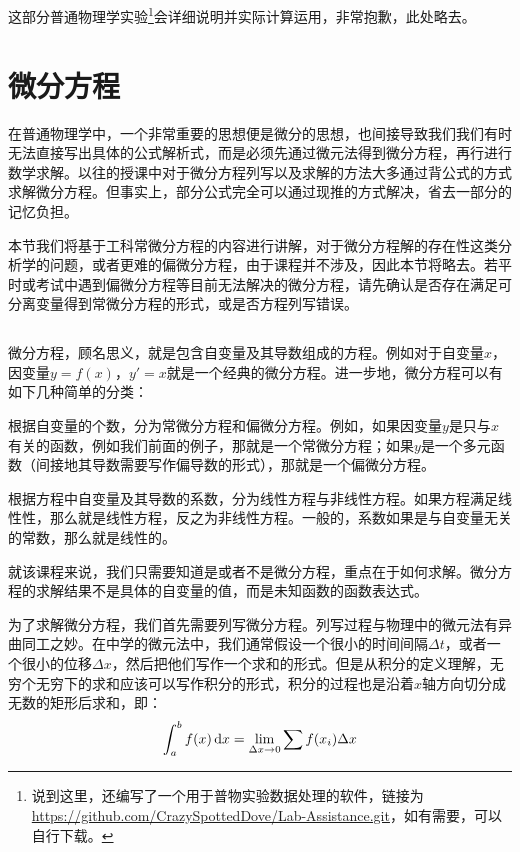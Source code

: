 \section[数据处理]{}
这部分普通物理学实验\footnote{说到这里，\dove 还编写了一个用于普物实验数据处理的软件，链接为 \url{https://github.com/CrazySpottedDove/Lab-Assistance.git}，如有需要，可以自行下载。}会详细说明并实际计算运用，非常抱歉，此处略去。

\section[微分方程]{微分方程}
在普通物理学中，一个非常重要的思想便是微分的思想，也间接导致我们我们有时无法直接写出具体的公式解析式，而是必须先通过微元法得到微分方程，再行进行数学求解。以往的授课中对于微分方程列写以及求解的方法大多通过背公式的方式求解微分方程。但事实上，部分公式完全可以通过现推的方式解决，省去一部分的记忆负担。

本节我们将基于工科常微分方程的内容进行讲解，对于微分方程解的存在性这类分析学的问题，或者更难的偏微分方程，由于课程并不涉及，因此本节将略去。若平时或考试中遇到偏微分方程等目前无法解决的微分方程，请先确认是否存在满足可分离变量得到常微分方程的形式，或是否方程列写错误。

\subsection[微分方程引入]{}
微分方程，顾名思义，就是包含自变量及其导数组成的方程。例如对于自变量$x$，因变量$y=f(x)$，$y' = x$就是一个经典的微分方程。进一步地，微分方程可以有如下几种简单的分类：
\begin{Itemize}
    \item 根据自变量的个数，分为常微分方程和偏微分方程。例如，如果因变量$y$是只与$x$有关的函数，例如我们前面的例子，那就是一个常微分方程；如果$y$是一个多元函数（间接地其导数需要写作偏导数的形式），那就是一个偏微分方程。
    \item 根据方程中自变量及其导数的系数，分为线性方程与非线性方程。如果方程满足线性性，那么就是线性方程，反之为非线性方程。一般的，系数如果是与自变量无关的常数，那么就是线性的。
\end{Itemize}

就该课程来说，我们只需要知道是或者不是微分方程，重点在于如何求解。微分方程的求解结果不是具体的自变量的值，而是未知函数的函数表达式。

为了求解微分方程，我们首先需要列写微分方程。列写过程与物理中的微元法有异曲同工之妙。在中学的微元法中，我们通常假设一个很小的时间间隔$\Delta t$，或者一个很小的位移$\Delta x$，然后把他们写作一个求和的形式。但是从积分的定义理解，无穷个无穷下的求和应该可以写作积分的形式，积分的过程也是沿着$x$轴方向切分成无数的矩形后求和，即：
\[\int_a^b f(x)\dif{x} = \lim_{\Delta x \to 0} \sum f(x_i)\Delta x\]

